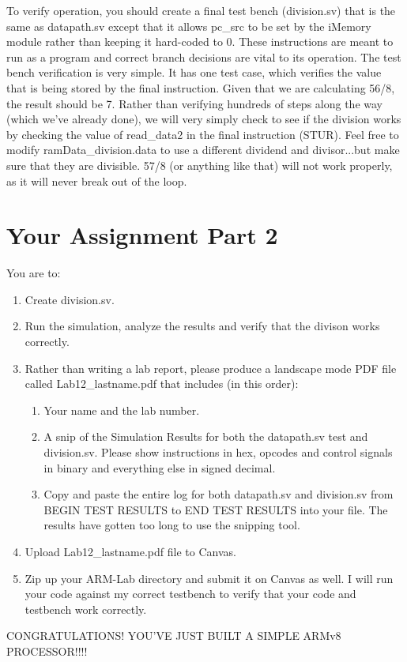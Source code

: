 To verify operation, you should create a final test bench (division.sv) that is the same as datapath.sv except that it allows pc\_src to be set by the iMemory module rather than keeping it hard-coded to 0.  These instructions are meant to run as a program and correct branch decisions are vital to its operation.  The test bench verification is very simple.  It has one test case, which verifies the value that is being stored by the final instruction.  Given that we are calculating 56/8, the result should be 7.  Rather than verifying hundreds of steps along the way (which we've already done), we will very simply check to see if the division works by checking the value of read\_data2 in the final instruction (STUR).  Feel free to modify ramData\_division.data to use a different dividend and divisor...but make sure that they are divisible.  57/8 (or anything like that) will not work properly, as it will never break out of the loop.



\section{Your Assignment Part 2}

You are to:
\begin{enumerate}
	\item Create division.sv.
	\item Run the simulation, analyze the results and verify that the divison works correctly.
	\item Rather than writing a lab report, please produce a landscape mode PDF file called Lab12\_lastname.pdf that includes (in this order):
	\begin{enumerate}
		\item Your name and the lab number.
		\item A snip of the Simulation Results for both the datapath.sv test and division.sv.  Please show instructions in hex, opcodes and control signals in binary and everything else in signed decimal.  
		\item Copy and paste the entire log for both datapath.sv and division.sv from BEGIN TEST RESULTS to END TEST RESULTS into your file.  The results have gotten too long to use the snipping tool.	
	\end{enumerate}
\item Upload Lab12\_lastname.pdf file to Canvas.
\item Zip up your ARM-Lab directory and submit it on Canvas as well.  I will run your code against my correct testbench to verify that your code and testbench work correctly.
\end{enumerate} 

CONGRATULATIONS!  YOU'VE JUST BUILT A SIMPLE ARMv8 PROCESSOR!!!!